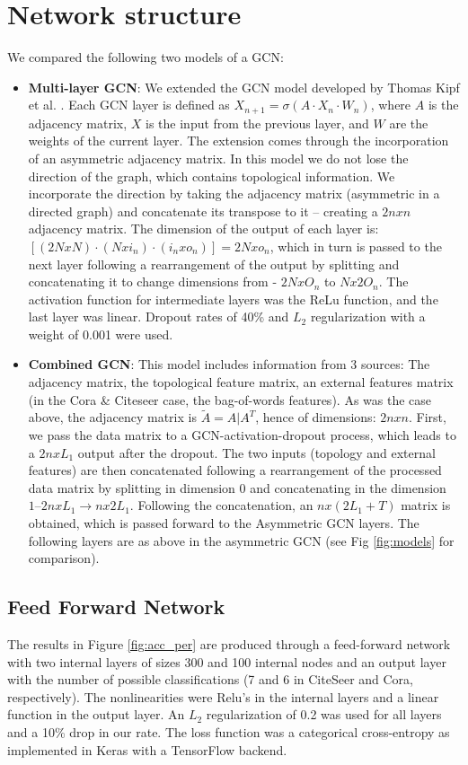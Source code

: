 \section{Network structure}
We compared the following two models of a GCN:
\begin{itemize}
\item   \textbf{Multi-layer GCN}: We extended the GCN model developed by Thomas Kipf et al. \cite{thomas2016semi}. Each GCN layer is defined as $X_{n+1}=\sigma(A\cdot X_{n}\cdot W_{n})$, where $A$ is the adjacency matrix, $X$ is the input from the previous layer, and $W$ are the weights of the current layer.  The extension comes through the incorporation of an asymmetric adjacency matrix. In this model we do not lose the direction of the graph, which contains topological information. We incorporate the direction by taking the adjacency matrix (asymmetric in a directed graph) and concatenate its transpose to it – creating a $2n x n$ adjacency matrix. The dimension of the output of each layer is: $[(2N x N)\cdot (N x i_{n})\cdot (i_{n} x o_{n})]=2N x o_{n}$, which in turn is passed to the next layer following a rearrangement of the output by splitting and concatenating it to change dimensions from - $2N x O_{n}$ to $N x 2O_{n}$. The activation function for intermediate layers was the ReLu function, and the last layer was linear. Dropout rates of 40\% and $L_{2}$ regularization with a weight of 0.001 were used.
\item   \textbf{Combined GCN}: This model includes information from 3 sources:  The adjacency matrix, the topological feature matrix, an external features matrix (in the Cora \& Citeseer case, the bag-of-words features). As was the case above, the adjacency matrix is $\tilde{A}=A|A^{T}$, hence of dimensions: $2n x n$. First, we pass the data matrix to a GCN-activation-dropout process, which leads to a $2n x L_{1}$ output after the dropout. The two inputs (topology and external features) are then concatenated following a rearrangement of the processed data matrix by splitting in dimension 0 and concatenating in the dimension $1–2n x L_{1}\rightarrow n x 2L_{1}$. Following the concatenation, an $n x (2L_{1}+T)$ matrix is obtained, which is passed forward to the Asymmetric GCN layers. The following layers are as above in the asymmetric GCN (see Fig \ref{fig:models} for comparison).
\end{itemize}

\subsection*{Feed Forward Network}
The results in Figure \ref{fig:acc_per} are produced through a feed-forward network with two internal layers of sizes 300 and 100 internal nodes and an output layer with the number of possible classifications (7 and 6 in CiteSeer and Cora, respectively). The nonlinearities were Relu’s in the internal layers and a linear function in the output layer. An $L_{2}$ regularization of 0.2 was used for all layers and a 10\% drop in our rate.  The loss function was a categorical cross-entropy as implemented in Keras with a TensorFlow backend.

